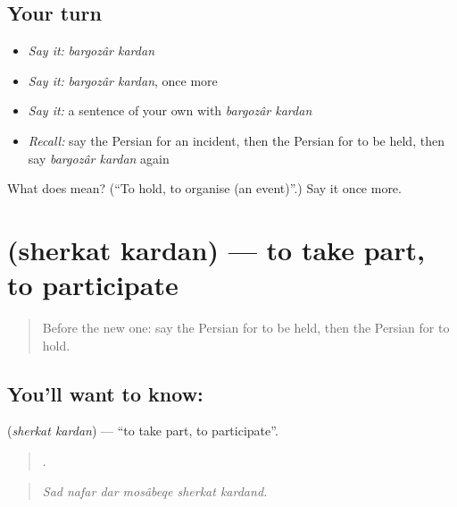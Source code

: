 \subsection*{Your turn}
\begin{itemize}
\raggedright
  \item \emph{Say it:} \emph{bargozâr kardan}
  \item \emph{Say it:} \emph{bargozâr kardan}, once more
  \item \emph{Say it:} a sentence of your own with \emph{bargozâr kardan}
  \item \emph{Recall:} say the Persian for an incident, then the Persian for to be held, then say \emph{bargozâr kardan} again
\end{itemize}

\begin{tcolorbox}[breakable,colback=teal!4,colframe=teal!35!black,title={Before you move on}]
What does   mean? (\textquotedblleft{}To hold, to organise (an event)\textquotedblright{}.) Say it once more.
\end{tcolorbox}
\section[\texorpdfstring{\fa{شرکت} \fa{کردن} (sherkat kardan)}{شرکت کردن (sherkat kardan)}]{  (sherkat kardan) — to take part, to participate}

\label{lesson:FA-C314-sherkat-kardan}



\begin{quote}
Before the new one: say the Persian for to be held, then the Persian for to hold.
\end{quote}

\subsection*{You'll want to know:  }
\textbf{ } (\emph{sherkat kardan}) — \textquotedblleft{}to take part, to participate\textquotedblright{}.

\begin{quote}
     .
\end{quote}

\begin{quote}
\emph{Sad nafar dar mosâbeqe sherkat kardand.}
\end{quote}

